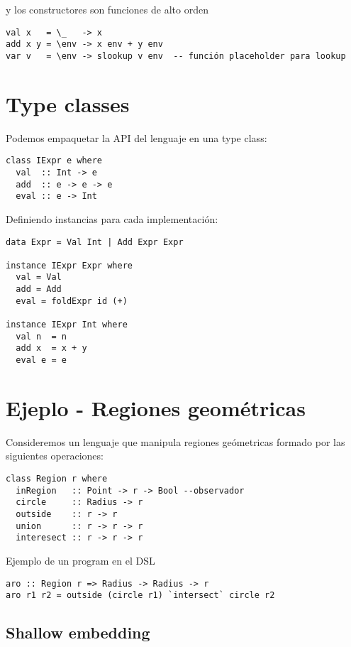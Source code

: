 \documentclass{article}
\begin{document}
y los constructores son funciones de alto orden

\begin{lstlisting}
val x   = \_   -> x
add x y = \env -> x env + y env
var v   = \env -> slookup v env  -- función placeholder para lookup
\end{lstlisting}

\newpage

\section{Type classes}\label{sec:type_classes}

\noindent Podemos empaquetar la API del lenguaje en una type class:
\begin{lstlisting}
class IExpr e where
  val  :: Int -> e
  add  :: e -> e -> e
  eval :: e -> Int
\end{lstlisting}

Definiendo instancias para cada implementación:

\begin{lstlisting}
data Expr = Val Int | Add Expr Expr

instance IExpr Expr where
  val = Val
  add = Add
  eval = foldExpr id (+)
    
instance IExpr Int where
  val n  = n
  add x  = x + y
  eval e = e
\end{lstlisting}

\section{Ejeplo - Regiones geométricas}\label{sec:ejemplo_regiones_geometricas}

\noindent Consideremos un lenguaje que manipula regiones geómetricas formado por las siguientes operaciones:

\begin{lstlisting}
class Region r where
  inRegion   :: Point -> r -> Bool --observador
  circle     :: Radius -> r
  outside    :: r -> r
  union      :: r -> r -> r
  interesect :: r -> r -> r
\end{lstlisting}

Ejemplo de un program en el DSL

\begin{lstlisting}
aro :: Region r => Radius -> Radius -> r
aro r1 r2 = outside (circle r1) `intersect` circle r2
\end{lstlisting}
  
\subsection{Shallow embedding}
\end{document}
